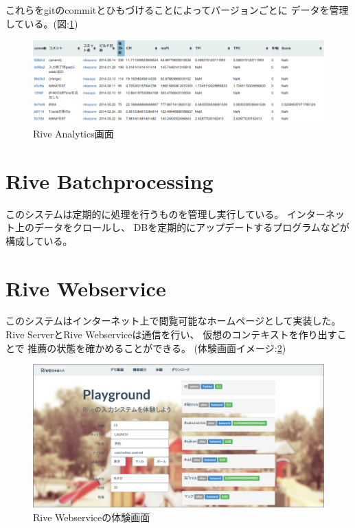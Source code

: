 これらをgitのcommitとひもづけることによってバージョンごとに
データを管理している。(図:\ref{fig:riveanalytics})
\begin{figure}[htbp]
  \begin{center}
    \includegraphics[width=170mm,bb=0 0 952 274]{images/riveanalytics.png}
    \caption{Rive Analytics画面}
    \label{fig:riveanalytics}
  \end{center}
\end{figure}

\section{Rive Batchprocessing}
このシステムは定期的に処理を行うものを管理し実行している。
インターネット上のデータをクロールし、
DBを定期的にアップデートするプログラムなどが構成している。

\section{Rive Webservice}
このシステムはインターネット上で閲覧可能なホームページとして実装した。
Rive ServerとRive Webserviceは通信を行い、
仮想のコンテキストを作り出すことで
推薦の状態を確かめることができる。
(体験画面イメージ:\ref{fig:rivewebservice})
\begin{figure}[htbp]
  \begin{center}
    \includegraphics[width=160mm,bb=0 0 1349 662]{images/rivewebservice.png}
    \caption{Rive Webserviceの体験画面}
    \label{fig:rivewebservice}
  \end{center}
\end{figure}

